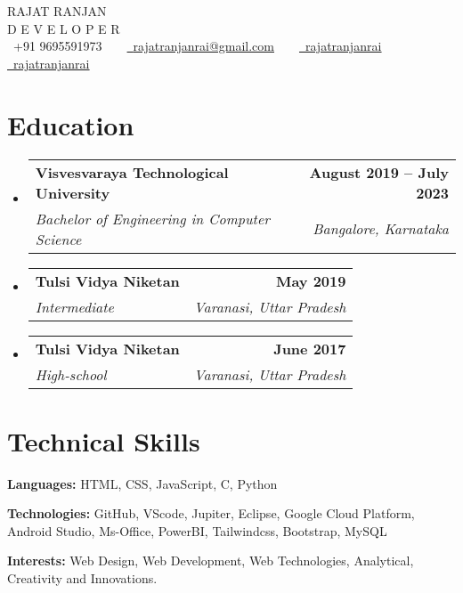 \documentclass[letterpaper,11pt]{article}
\makeatletter
\newcommand{\resumeSubheading}[4]{
  \vspace{-2pt}\item
    \begin{tabular*}{1.0\textwidth}[t]{l@{\extracolsep{\fill}}r}
      \textbf{#1} & \textbf{\small #2} \\
      \textit{\small#3} & \textit{\small #4} \\
    \end{tabular*}\vspace{-7pt}
}
\newcommand{\resumeSubHeadingListStart}{\begin{itemize}[leftmargin=0.0in, label={}]}
\newcommand{\resumeSubHeadingListEnd}{\end{itemize}}
\makeatother
\begin{document}

\begin{center}
    {\Huge \scshape RAJAT RANJAN} \\ \vspace{1pt}
    D E V E L O P E R \\ \vspace{3pt} 
    \small \raisebox{-0.1\height}\faPhone\ +91 9695591973 ~ ~ \href{mailto:rajatranjanrai@gmail.com}{\raisebox{-0.2\height}\faEnvelope\  \underline{rajatranjanrai@gmail.com}} ~ ~ 
    \href{https://www.linkedin.com/in/rajatranjanrai/}{\raisebox{-0.2\height}\faLinkedin\ \underline{rajatranjanrai}}  ~ ~
    \href{https://github.com/rajatranjanrai}{\raisebox{-0.2\height}\faGithub\ \underline{rajatranjanrai}}
    \vspace{-8pt}
\end{center}


\section{Education}
  \resumeSubHeadingListStart
    \resumeSubheading
      {Visvesvaraya Technological University}{August 2019 -- July 2023}
      {Bachelor of Engineering in Computer Science}{Bangalore, Karnataka}
      \resumeSubheading
      {Tulsi Vidya Niketan}{May 2019}
      {Intermediate}{Varanasi, Uttar Pradesh}
      \resumeSubheading
      {Tulsi Vidya Niketan}{June 2017}
      {High-school}{Varanasi, Uttar Pradesh}
  \resumeSubHeadingListEnd

\section{Technical Skills}
\begin{itemize}[leftmargin=0.15in, label={}]
    \small{
        \item \textbf{Languages:} HTML, CSS, JavaScript, C, Python
        \vspace{3pt}
        \item \textbf{Technologies:} GitHub, VScode, Jupiter, Eclipse, Google Cloud Platform, Android Studio, Ms-Office, PowerBI, Tailwindcss, Bootstrap, MySQL
        \vspace{3pt}
        \item \textbf{Interests:} Web Design, Web Development, Web Technologies, Analytical, Creativity and Innovations.
    }
\end{itemize}
\vspace{-10pt}
\end{document}
